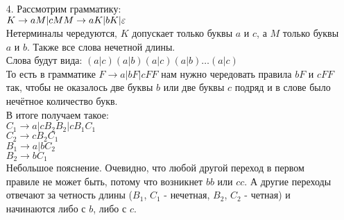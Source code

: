 \documentclass[12pt]{article}
\begin{document}
\begin{enumerate}
 \item [4.] Рассмотрим грамматику: \\
 $K \rightarrow aM | cM \\
 M \rightarrow aK | bK | \varepsilon$ \\
 Нетерминалы чередуются, $K$ допускает только буквы $a$ и $c$, а $M$ только буквы $a$ и $b$. Также все слова нечетной длины.\\ Слова будут вида: $(a|c)(a|b)(a|c)(a|b)\dots(a|c)$ \\ 
 То есть в грамматике $F \rightarrow a | bF | cFF$ нам нужно чередовать правила $bF$ и $cFF$ так, чтобы не оказалось две буквы $b$ или две буквы $c$ подряд и в слове было нечётное количество букв.\\
 В итоге получаем такое: \\
 $C_1 \to a | cB_2B_2 | cB_1C_1$ \\
 $C_2 \to cB_2C_1$ \\
 $B_1 \to a | bC_2$ \\
 $B_2 \to bC_1$ \\
 Небольшое пояснение. Очевидно, что любой другой переход в первом правиле не может быть, потому что возникнет $bb$ или $cc$. А другие переходы отвечают за четность длины ($B_1$, $C_1$ - нечетная, $B_2$, $C_2$ - четная) и начинаются либо с $b$, либо с $c$.

\end{enumerate}
\end{document}
